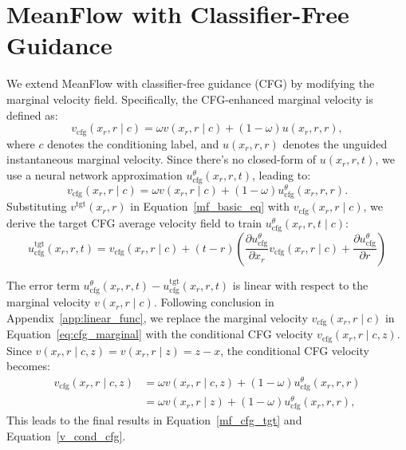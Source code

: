 \section{MeanFlow with Classifier-Free Guidance}\label{app:cfg}

We extend MeanFlow with classifier-free guidance (CFG) by modifying the marginal velocity field. Specifically, the CFG-enhanced marginal velocity is defined as:
\begin{equation*}
  v_\text{cfg} (x_r, r \mid c) = \omega v(x_r, r \mid c) + (1 - \omega) u(x_r, r, r),
\end{equation*}
where $c$ denotes the conditioning label, and $u(x_r, r, r)$ denotes the unguided instantaneous marginal velocity.  Since there's no closed-form of $u(x_r, r, t)$, we use a neural network approximation $u^\theta_\text{cfg}(x_r, r, t)$, leading to:
%
\begin{equation}
  v_\text{cfg} (x_r, r \mid c) = \omega v(x_r, r \mid c) + (1 - \omega) u^\theta_\text{cfg} (x_r, r, r).
\end{equation}
%
Substituting $v^\text{tgt}(x_r, r)$ in Equation~\eqref{mf_basic_eq} with $v_\text{cfg}(x_r, r \mid c)$, we derive the target CFG average velocity field to train $u^\theta_\text{cfg}(x_r, r, t \mid c)$:
\begin{equation}\label{eq:cfg_marginal}
  u_\text{cfg}^\text{tgt} (x_r, r, t) = v_\text{cfg} (x_r, r \mid c) + (t - r) \left( \frac{\partial u^\theta_\text{cfg}}{\partial x_r} v_\text{cfg}(x_r, r \mid c) + \frac{\partial u^\theta_\text{cfg}}{\partial r} \right)
\end{equation}

The error term $u^\theta_\text{cfg}(x_r, r, t) - u^\text{tgt}_\text{cfg}(x_r, r, t)$ is linear with respect to the marginal velocity $v(x_r, r \mid c)$. Following conclusion in Appendix~\ref{app:linear_func}, we replace the marginal velocity $v_\text{cfg}(x_r, r \mid c)$ in Equation~\eqref{eq:cfg_marginal} with the conditional CFG velocity $v_\text{cfg}(x_r, r \mid c, z)$. Since $v(x_r, r \mid c, z) = v(x_r, r \mid z) = z - x$, the conditional CFG velocity becomes:
%
\begin{align}
  v_\text{cfg} (x_r, r \mid c, z) &= \omega v(x_r, r \mid c, z) + (1 - \omega) u_\text{cfg}^\theta(x_r, r, r) \nonumber \\
  &= \omega v(x_r, r \mid z) + (1 - \omega) u_\text{cfg}^\theta(x_r, r, r),
\end{align}
%
This leads to the final results in Equation~\eqref{mf_cfg_tgt} and Equation~\eqref{v_cond_cfg}.


